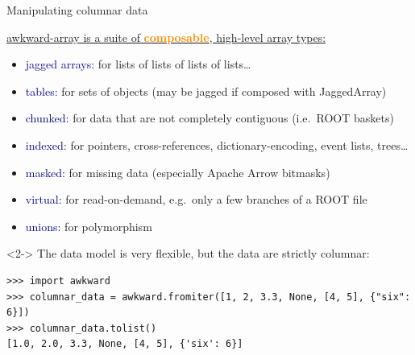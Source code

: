 \documentclass[aspectratio=169]{beamer}
\begin{document}
\begin{frame}[fragile]{Manipulating columnar data}
\vspace{0.5 cm}

\underline{awkward-array is a suite of \textcolor{darkorange}{\bf composable}, high-level array types:}

\vspace{0.2 cm}
\begin{itemize}
\item \textcolor{darkblue}{jagged arrays:} for lists of lists of lists of lists\ldots
\item \textcolor{darkblue}{tables:} for sets of objects (may be jagged if composed with JaggedArray)
\item \textcolor{darkblue}{chunked:} for data that are not completely contiguous (i.e.\ ROOT baskets)
\item \textcolor{darkblue}{indexed:} for pointers, cross-references, dictionary-encoding, event lists, trees\ldots
\item \textcolor{darkblue}{masked:} for missing data (especially Apache Arrow bitmasks)
\item \textcolor{darkblue}{virtual:} for read-on-demand, e.g.\ only a few branches of a ROOT file
\item \textcolor{darkblue}{unions:} for polymorphism
\end{itemize}

\vspace{0.5 cm}
\begin{uncoverenv}<2->
The data model is very flexible, but the data are strictly columnar:

\scriptsize
\begin{verbatim}
>>> import awkward
>>> columnar_data = awkward.fromiter([1, 2, 3.3, None, [4, 5], {"six": 6}])
>>> columnar_data.tolist()
[1.0, 2.0, 3.3, None, [4, 5], {'six': 6}]
\end{verbatim}
\end{uncoverenv}
\end{frame}
\end{document}
